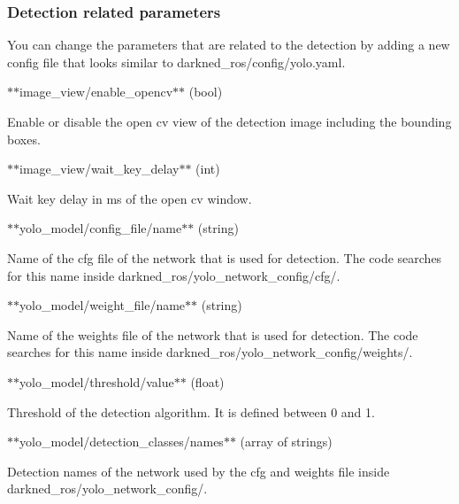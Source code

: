 \subsubsection*{Detection related parameters}

You can change the parameters that are related to the detection by adding a new config file that looks similar to {\ttfamily darkned\+\_\+ros/config/yolo.\+yaml}.


\begin{DoxyItemize}
\item $\ast$$\ast${\ttfamily image\+\_\+view/enable\+\_\+opencv}$\ast$$\ast$ (bool)

Enable or disable the open cv view of the detection image including the bounding boxes.
\item $\ast$$\ast${\ttfamily image\+\_\+view/wait\+\_\+key\+\_\+delay}$\ast$$\ast$ (int)

Wait key delay in ms of the open cv window.
\item $\ast$$\ast${\ttfamily yolo\+\_\+model/config\+\_\+file/name}$\ast$$\ast$ (string)

Name of the cfg file of the network that is used for detection. The code searches for this name inside {\ttfamily darkned\+\_\+ros/yolo\+\_\+network\+\_\+config/cfg/}.
\item $\ast$$\ast${\ttfamily yolo\+\_\+model/weight\+\_\+file/name}$\ast$$\ast$ (string)

Name of the weights file of the network that is used for detection. The code searches for this name inside {\ttfamily darkned\+\_\+ros/yolo\+\_\+network\+\_\+config/weights/}.
\item $\ast$$\ast${\ttfamily yolo\+\_\+model/threshold/value}$\ast$$\ast$ (float)

Threshold of the detection algorithm. It is defined between 0 and 1.
\item $\ast$$\ast${\ttfamily yolo\+\_\+model/detection\+\_\+classes/names}$\ast$$\ast$ (array of strings)

Detection names of the network used by the cfg and weights file inside {\ttfamily darkned\+\_\+ros/yolo\+\_\+network\+\_\+config/}. 
\end{DoxyItemize}